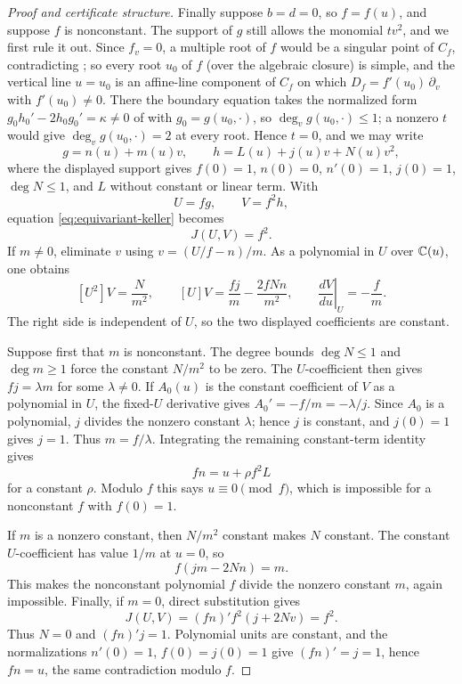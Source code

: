 \begin{proof}[Proof and certificate structure]
Finally suppose \(b=d=0\), so \(f=f(u)\), and suppose \(f\) is
nonconstant.  The support of \(g\) still allows the monomial \(tv^2\),
and we first rule it out.  Since \(f_v=0\), a multiple root of \(f\)
would be a singular point of \(C_f\), contradicting
; so every root \(u_0\) of \(f\) (over
the algebraic closure) is simple, and the vertical line \(u=u_0\) is an
affine-line component of \(C_f\) on which \(D_f=f'(u_0)\,\partial_v\)
with \(f'(u_0)\ne0\).  There the boundary equation takes the normalized
form \(g_0h_0'-2h_0g_0'=\kappa\ne0\) of 
with \(g_0=g(u_0,\cdot)\), so \(\deg_v g(u_0,\cdot)\le1\); a nonzero
\(t\) would give \(\deg_v g(u_0,\cdot)=2\) at every root.  Hence
\(t=0\), and we may write
\[
g=n(u)+m(u)v,\qquad
h=L(u)+j(u)v+N(u)v^2,
\]
where the displayed support gives \(f(0)=1\), \(n(0)=0\), \(n'(0)=1\),
\(j(0)=1\), \(\deg N\le1\), and \(L\) without constant or linear term.
With
\[
U=fg,\qquad V=f^2h,
\]
equation \eqref{eq:equivariant-keller} becomes
\[
J(U,V)=f^2.
\]
If \(m\ne0\), eliminate \(v\) using \(v=(U/f-n)/m\).  As a polynomial
in \(U\) over \(\mathbb C(u)\), one obtains
\[
[U^2]V=\frac{N}{m^2},\qquad
[U]V=\frac{fj}{m}-\frac{2fNn}{m^2},\qquad
\left.\frac{dV}{du}\right|_U=-\frac{f}{m}.
\]
The right side is independent of \(U\), so the two displayed coefficients
are constant.

Suppose first that \(m\) is nonconstant.  The degree bounds
\(\deg N\le1\) and \(\deg m\ge1\) force the constant \(N/m^2\) to be zero.
The \(U\)-coefficient then gives \(fj=\lambda m\) for some
\(\lambda\ne0\).  If \(A_0(u)\) is the constant coefficient of \(V\) as a
polynomial in \(U\), the fixed-\(U\) derivative gives
\(A_0'=-f/m=-\lambda/j\).  Since \(A_0\) is a polynomial, \(j\) divides the
nonzero constant \(\lambda\); hence \(j\) is constant, and \(j(0)=1\) gives
\(j=1\).  Thus \(m=f/\lambda\).  Integrating the remaining constant-term
identity gives
\[
fn=u+\rho f^2L
\]
for a constant \(\rho\).  Modulo \(f\) this says \(u\equiv0\pmod f\),
which is impossible for a nonconstant \(f\) with \(f(0)=1\).

If \(m\) is a nonzero constant, then \(N/m^2\) constant makes \(N\)
constant.  The constant \(U\)-coefficient has value \(1/m\) at \(u=0\),
so
\[
f(jm-2Nn)=m.
\]
This makes the nonconstant polynomial \(f\) divide the nonzero constant
\(m\), again impossible.  Finally, if \(m=0\), direct substitution gives
\[
J(U,V)=(fn)'f^2(j+2Nv)=f^2.
\]
Thus \(N=0\) and \((fn)'j=1\).  Polynomial units are constant, and the
normalizations \(n'(0)=1\), \(f(0)=j(0)=1\) give \((fn)'=j=1\), hence
\(fn=u\), the same contradiction modulo \(f\).


\end{proof}
